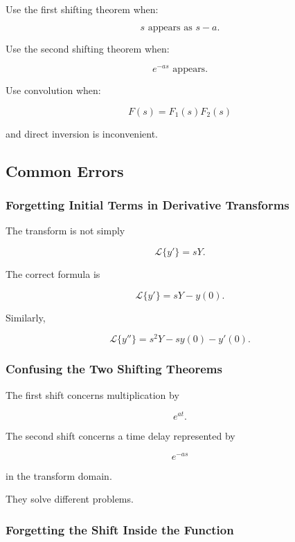 Use the first shifting theorem when:

\[
\boxed{
s
\text{ appears as }
s-a.
}
\]

Use the second shifting theorem when:

\[
\boxed{
e^{-as}
\text{ appears}.
}
\]

Use convolution when:

\[
\boxed{
F(s)
=
F_1(s)F_2(s)
}
\]

and direct inversion is inconvenient.

\subsection{Common Errors}
\label{subsec:transform-method-common-errors}

\subsubsection{Forgetting Initial Terms in Derivative Transforms}

The transform is not simply

\[
\mathcal{L}\{y'\}
=
sY.
\]

The correct formula is

\[
\boxed{
\mathcal{L}\{y'\}
=
sY-y(0).
}
\]

Similarly,

\[
\boxed{
\mathcal{L}\{y''\}
=
s^2Y
-
sy(0)
-
y'(0).
}
\]

\subsubsection{Confusing the Two Shifting Theorems}

The first shift concerns multiplication by

\[
e^{at}.
\]

The second shift concerns a time delay represented by

\[
e^{-as}
\]

in the transform domain.

They solve different problems.

\subsubsection{Forgetting the Shift Inside the Function}

